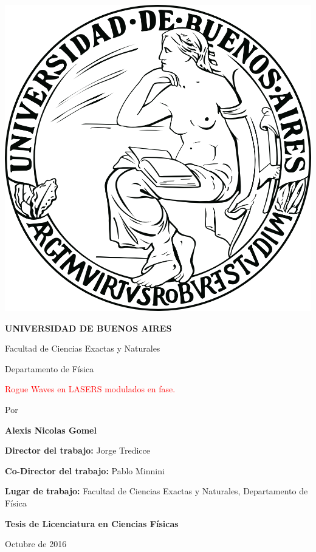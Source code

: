 \thispagestyle{empty}

\begin {center}

\includegraphics[scale=.3]{./img_caraturla/logo-uba-3.png}

\bigskip
{\bf{UNIVERSIDAD DE BUENOS AIRES}}

\vspace{24pt}

Facultad de Ciencias Exactas y Naturales

\vspace{12pt}
Departamento de F\'isica


\vspace{1.7cm}

{\large \textcolor{red}{Rogue Waves en LASERS modulados en fase.}}


\vspace{1.7cm}
\small{Por}

\textbf{Alexis Nicolas Gomel}




\vspace{1.3cm}
\textbf{Director del trabajo:} Jorge Tredicce

\textbf{Co-Director del trabajo:} Pablo Minnini


\textbf{Lugar de trabajo:} Facultad de Ciencias Exactas y Naturales, Departamento de Física

\vspace{2cm}

\textbf{Tesis de Licenciatura en Ciencias Físicas}

Octubre de 2016

\end {center}


